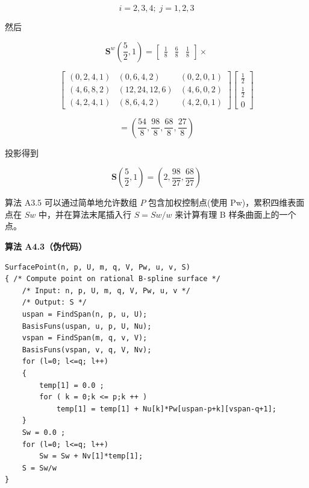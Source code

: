 \documentclass[../main.tex]{subfiles}
\begin{document}
\[
i = 2,3,4;\;j = 1,2,3
\]

然后

\[
{\mathbf{S}}^{w}\left( {\frac{5}{2},1}\right)  = \left\lbrack  \begin{array}{lll} \frac{1}{8} & \frac{6}{8} & \frac{1}{8} \end{array}\right\rbrack   \times
\]

\[
\left\lbrack  \begin{matrix} \left( {0,2,4,1}\right) & \left( {0,6,4,2}\right) & \left( {0,2,0,1}\right) \\  \left( {4,6,8,2}\right) & \left( {{12},{24},{12},6}\right) & \left( {4,6,0,2}\right) \\  \left( {4,2,4,1}\right) & \left( {8,6,4,2}\right) & \left( {4,2,0,1}\right)  \end{matrix}\right\rbrack  \left\lbrack  \begin{matrix} \frac{1}{2} \\  \frac{1}{2} \\  0 \end{matrix}\right\rbrack
\]

\[
= \left( {\frac{54}{8},\frac{98}{8},\frac{68}{8},\frac{27}{8}}\right)
\]

投影得到

\[
\mathbf{S}\left( {\frac{5}{2},1}\right)  = \left( {2,\frac{98}{27},\frac{68}{27}}\right)
\]



算法 A3.5 可以通过简单地允许数组 \(P\) 包含加权控制点(使用 Pw)，累积四维表面点在 \({Sw}\) 中，并在算法末尾插入行 \(S = {Sw}/w\) 来计算有理 B 样条曲面上的一个点。

\par\medskip\noindent\textbf{算法 A4.3（伪代码）}\par
\begin{verbatim}
SurfacePoint(n, p, U, m, q, V, Pw, u, v, S)
{ /* Compute point on rational B-spline surface */
    /* Input: n, p, U, m, q, V, Pw, u, v */
    /* Output: S */
    uspan = FindSpan(n, p, u, U);
    BasisFuns(uspan, u, p, U, Nu);
    vspan = FindSpan(m, q, v, V);
    BasisFuns(vspan, v, q, V, Nv);
    for (l=0; l<=q; l++)
    {
        temp[1] = 0.0 ;
        for ( k = 0;k <= p;k ++ )
            temp[1] = temp[1] + Nu[k]*Pw[uspan-p+k][vspan-q+1];
    }
    Sw = 0.0 ;
    for (l=0; l<=q; l++)
        Sw = Sw + Nv[1]*temp[1];
    S = Sw/w
}
\end{verbatim}
\end{document}
